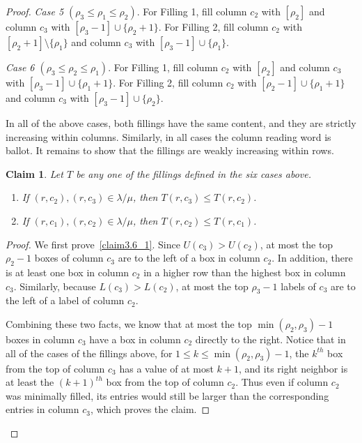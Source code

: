 \documentclass[10pt]{article}
\newtheorem{claim}[theorem]{Claim}
\theoremstyle{definition}
\let\hypertargeta\hypertarget %
\newenvironment{Case}[1]{\par\vskip2pt\noindent%
\emph{#1}.}{\vskip2pt}
\begin{document}
\begin{proof}
\begin{Case}
{\hypertargeta{prop3.5case_5}{Case 5} $(\rho_3\leq \rho_1 \leq \rho_2)$} 
For Filling 1, fill column $c_2$ with $[\rho_2]$ and column $c_3$ with $[\rho_3-1]\cup \{ \rho_2+1\}$. For Filling 2, fill column $c_2$ with $[\rho_2+1]\setminus \{\rho_1\}$ and column $c_3$ with $[\rho_3-1]\cup \{\rho_1\}$.
\end{Case}

\begin{Case}
{\hypertargeta{prop3.5case_6}{Case 6} $(\rho_3\leq \rho_2 \leq \rho_1)$} 
For Filling 1, fill column $c_2$ with $[\rho_2]$ and column $c_3$ with $[\rho_3-1]\cup \{\rho_1+1\}$. For Filling 2, fill column $c_2$ with $[\rho_2-1]\cup \{\rho_1+1\}$ and column $c_3$ with $[\rho_3-1]\cup\{ \rho_2\}$.
\end{Case}


In all of the above cases, both fillings have the same content, and they are strictly increasing within columns. Similarly, in all cases the column reading word is ballot. It remains to show that the fillings are weakly increasing within rows.


\begin{claim}
\label{claim:c2c3}
Let $T$ be any one of the fillings defined in the six cases above. 
\begin{enumerate}[label=(\Roman{*})]
\item\label{claim3.6_1} If $(r,c_2),(r,c_3)\in \lambda/\mu$, then $T(r,c_3) \leq T(r,c_2)$.
\item\label{claim3.6_2} If $(r,c_1),(r,c_2)\in \lambda/\mu$, then $T(r,c_2) \leq T(r,c_1)$.
\end{enumerate}
\end{claim}
\begin{proof}
We first prove~\ref{claim3.6_1}. Since $U(c_3)>U(c_2)$, at most the top $\rho_2-1$ boxes of column $c_3$ are to the left of a box in column $c_2$. In addition, there is at least one box in column $c_2$ in a higher row than the highest box in column $c_3$. Similarly, because $L(c_3)>L(c_2)$, at most the top $\rho_3-1$ labels of $c_3$ are to the left of a label of column $c_2$.

Combining these two facts, we know that at most the top $\min(\rho_2,\rho_3)-1$ boxes in column $c_3$ have a box in column $c_2$ directly to the right. Notice that in all of the cases of the fillings above, for $1\leq k\leq \min(\rho_2,\rho_3)-1$, the $k^{th}$ box from the top of column $c_3$ has a value of at most $k+1$, and its right neighbor is at least the $(k+1)^{th}$ box from the top of column $c_2$. Thus even if column $c_2$ was minimally filled, its entries would still be larger than the corresponding entries in column $c_3$, which proves the claim.


\end{proof}
\end{proof}
\end{document}
